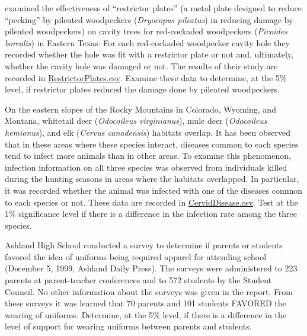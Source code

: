 \documentclass[10pt,openany]{book}\usepackage[]{graphicx}\usepackage[]{color}
\begin{document}
\newpage
\begin{exsection}
  \item \label{revex:ChiWoodpeckers} \rhw{} \cite{Saenzetal1998} examined the effectiveness of ``restrictor plates'' (a metal plate designed to reduce ``pecking'' by pileated woodpeckers (\emph{Dryocopus pileatus}) in reducing damage by pileated woodpeckers) on cavity trees for red-cockaded woodpeckers (\emph{Picoides borealis}) in Eastern Texas.  For each red-cockaded woodpecker cavity hole they recorded whether the hole was fit with a restrictor plate or not and, ultimately, whether the cavity hole was damaged or not.  The results of their study are recorded in \href{https://raw.githubusercontent.com/droglenc/NCData/master/RestrictorPlates.csv}{RestrictorPlates.csv}.  Examine these data to determine, at the 5\% level, if restrictor plates reduced the damage done by pileated woodpeckers. 

  \item \label{revex:ChiCervids} \rhw{} On the eastern slopes of the Rocky Mountains in Colorado, Wyoming, and Montana, whitetail deer (\textit{Odocoileus virginianus}), mule deer (\textit{Odocoileus hemionus}), and elk (\textit{Cervus canadensis}) habitats overlap.  It has been observed that in these areas where these species interact, diseases common to each species tend to infect more animals than in other areas.  To examine this phenomenon, infection information on all three species was observed from individuals killed during the hunting seasons in areas where the habitats overlapped.  In particular, it was recorded whether the animal was infected with one of the diseases common to each species or not.  These data are recorded in \href{https://raw.githubusercontent.com/droglenc/NCData/master/CervidDisease.csv}{CervidDisease.csv}.  Test at the 1\% significance level if there is a difference in the infection rate among the three species. 

  \item \label{revex:ChiAshland} \rhw{} Ashland High School conducted a survey to determine if parents or students favored the idea of uniforms being required apparel for attending school (December 5, 1999, Ashland Daily Press).  The surveys were administered to 223 parents at parent-teacher conferences and to 572 students by the Student Council.  No other information about the surveys was given in the report.  From these surveys it was learned that 70 parents and 101 students FAVORED the wearing of uniforms.  Determine, at the 5\% level, if there is a difference in the level of support for wearing uniforms between parents and students. 


\end{exsection}
\end{document}
